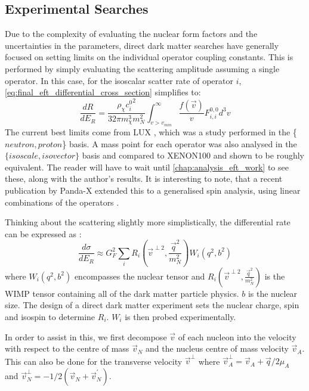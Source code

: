 \subsection{Experimental Searches}
\par
Due to the complexity of evaluating the nuclear form factors and the uncertainties in the parameters, direct dark matter searches have generally focused on setting limits on the individual operator coupling constants.
This is performed by simply evaluating the scattering amplitude assuming a single operator.
In this case, for the isoscalar scatter rate of operator $i$, \autoref{eq:final_eft_differential_cross_section} simplifies to:
\begin{equation}
    \frac{dR}{dE_R} = \frac{\rho_{\chi} {c_i^{0}}^2}{32 \pi m_\chi^3 m_N^2} \int^{\infty}_{v>v_{min}} \frac{f(\vec{v})}{v} F_{i,i}^{0,0} d^3 v
    \label{eq:final_eft_differential_cross_section}
\end{equation}
The current best limits come from LUX \cite{LUX_RUN4_EFT_2021}, which was a study performed in the \{$neutron,proton$\} basis.
A mass point for each operator was also analysed in the $\{isoscale, isovector\}$ basis and compared to XENON100 \cite{xenon100_eft_ref} and shown to be roughly equivalent.
The reader will have to wait until \autoref{chap:analysis_eft_work} to see these, along with the author's results.
It is interesting to note, that a recent publication by Panda-X extended this to a generalised spin analysis, using linear combinations of the operators \cite{pandax_2_eft_ref}.

\par
Thinking about the scattering slightly more simplistically, the differential rate can be expressed as \cite{simple_eft_ref}:
\begin{equation}
    \frac{d\sigma}{dE_R} \approx G_F^2 \sum_{i} R_i (\vec{v}^{\perp 2}, \frac{\vec{q}^2}{m_N^2}) W_i(q^2,b^2)
\end{equation}
where $W_i(q^2,b^2)$ encompasses the nuclear tensor and $R_i (\vec{v}^{\perp 2}, \frac{\vec{q}^2}{m_N^2})$ is the WIMP tensor containing all of the dark matter particle physics.
$b$ is the nuclear size.
The design of a direct dark matter experiment sets the nuclear charge, spin and isospin to determine $R_i$.
$W_i$ is then probed experimentally.



\iffalse


In order to assist in this, we first decompose $\vec{v}$ of each nucleon into the velocity with respect to the centre of mass $\vec{v}_{N}$ and the nucleus centre of mass velocity $\vec{v}_{A}$.
This can also be done for the transverse velocity $\vec{v}^{\perp}$ where $\vec{v}^{\perp}_{A}=\vec{v}_A + \vec{q}/2\mu_{A}$ and $\vec{v}^{\perp}_{N}=-1/2(\vec{v}_{N} + \vec{v}^{'}_{N})$.

